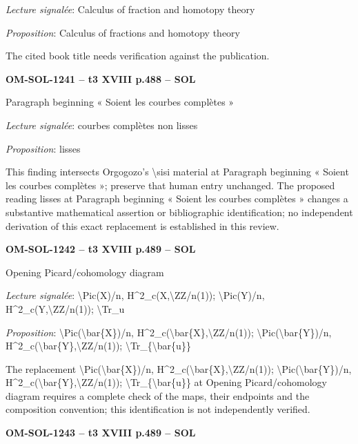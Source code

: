 \emph{Lecture signalée}: Calculus of fraction and homotopy theory\par
\emph{Proposition}: Calculus of fractions and homotopy theory\par
The cited book title needs verification against the publication.\par
\par\noindent\textbf{OM-SOL-1241 -- t3 XVIII p.488 -- SOL}\par
Paragraph beginning « Soient les courbes complètes »\par
\emph{Lecture signalée}: courbes complètes non lisses\par
\emph{Proposition}: lisses\par
This finding intersects Orgogozo's \textbackslash{}sisi material at Paragraph beginning « Soient les courbes complètes »; preserve that human entry unchanged. The proposed reading lisses at Paragraph beginning « Soient les courbes complètes » changes a substantive mathematical assertion or bibliographic identification; no independent derivation of this exact replacement is established in this review.\par
\par\noindent\textbf{OM-SOL-1242 -- t3 XVIII p.489 -- SOL}\par
Opening Picard/cohomology diagram\par
\emph{Lecture signalée}: \textbackslash{}Pic(X)/n, H\textasciicircum{}2\_c(X,\textbackslash{}ZZ/n(1)); \textbackslash{}Pic(Y)/n, H\textasciicircum{}2\_c(Y,\textbackslash{}ZZ/n(1)); \textbackslash{}Tr\_u\par
\emph{Proposition}: \textbackslash{}Pic(\textbackslash{}bar\{X\})/n, H\textasciicircum{}2\_c(\textbackslash{}bar\{X\},\textbackslash{}ZZ/n(1)); \textbackslash{}Pic(\textbackslash{}bar\{Y\})/n, H\textasciicircum{}2\_c(\textbackslash{}bar\{Y\},\textbackslash{}ZZ/n(1)); \textbackslash{}Tr\_\{\textbackslash{}bar\{u\}\}\par
The replacement \textbackslash{}Pic(\textbackslash{}bar\{X\})/n, H\textasciicircum{}2\_c(\textbackslash{}bar\{X\},\textbackslash{}ZZ/n(1)); \textbackslash{}Pic(\textbackslash{}bar\{Y\})/n, H\textasciicircum{}2\_c(\textbackslash{}bar\{Y\},\textbackslash{}ZZ/n(1)); \textbackslash{}Tr\_\{\textbackslash{}bar\{u\}\} at Opening Picard/cohomology diagram requires a complete check of the maps, their endpoints and the composition convention; this identification is not independently verified.\par
\par\noindent\textbf{OM-SOL-1243 -- t3 XVIII p.489 -- SOL}\par
